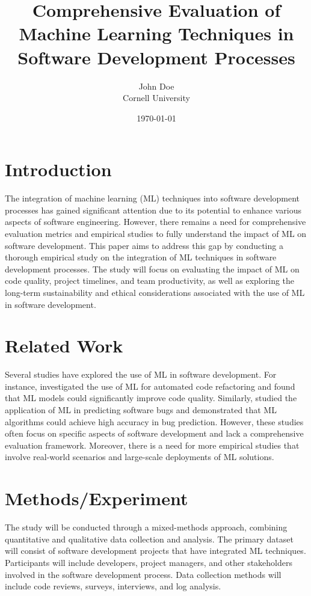 \documentclass{article}
\title{Comprehensive Evaluation of Machine Learning Techniques in Software Development Processes}
\author{John Doe \\ Cornell University}
\date{\today}
\begin{document}
\maketitle

\section{Introduction}
The integration of machine learning (ML) techniques into software development processes has gained significant attention due to its potential to enhance various aspects of software engineering. However, there remains a need for comprehensive evaluation metrics and empirical studies to fully understand the impact of ML on software development. This paper aims to address this gap by conducting a thorough empirical study on the integration of ML techniques in software development processes. The study will focus on evaluating the impact of ML on code quality, project timelines, and team productivity, as well as exploring the long-term sustainability and ethical considerations associated with the use of ML in software development.

\section{Related Work}
Several studies have explored the use of ML in software development. For instance, \cite{Chen2019} investigated the use of ML for automated code refactoring and found that ML models could significantly improve code quality. Similarly, \cite{Wang2020} studied the application of ML in predicting software bugs and demonstrated that ML algorithms could achieve high accuracy in bug prediction. However, these studies often focus on specific aspects of software development and lack a comprehensive evaluation framework. Moreover, there is a need for more empirical studies that involve real-world scenarios and large-scale deployments of ML solutions.

\section{Methods/Experiment}
The study will be conducted through a mixed-methods approach, combining quantitative and qualitative data collection and analysis. The primary dataset will consist of software development projects that have integrated ML techniques. Participants will include developers, project managers, and other stakeholders involved in the software development process. Data collection methods will include code reviews, surveys, interviews, and log analysis.
\end{document}
